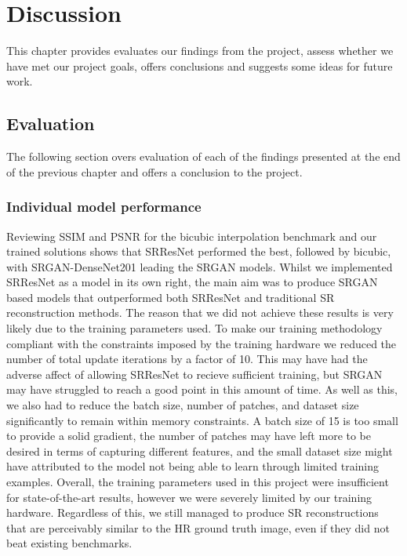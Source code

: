 \chapter{Discussion}
\label{chapter4}
This chapter provides evaluates our findings from the project, assess whether we have met our project goals, offers conclusions and suggests some ideas for future work.

\section{Evaluation}
The following section overs evaluation of each of the findings presented at the end of the previous chapter and offers a conclusion to the project.

\subsection{Individual model performance}
Reviewing SSIM and PSNR for the bicubic interpolation benchmark and our trained solutions shows that SRResNet performed the best, followed by bicubic, with SRGAN-DenseNet201 leading the SRGAN models. Whilst we implemented SRResNet as a model in its own right, the main aim was to produce SRGAN based models that outperformed both SRResNet and traditional SR reconstruction methods. The reason that we did not achieve these results is very likely due to the training parameters used. To make our training methodology compliant with the constraints imposed by the training hardware we reduced the number of total update iterations by a factor of 10. This may have had the adverse affect of allowing SRResNet to recieve sufficient training, but SRGAN may have struggled to reach a good point in this amount of time. As well as this, we also had to reduce the batch size, number of patches, and dataset size significantly to remain within memory constraints. A batch size of 15 is too small to provide a solid gradient, the number of patches may have left more to be desired in terms of capturing different features, and the small dataset size might have attributed to the model not being able to learn through limited training examples. Overall, the training parameters used in this project were insufficient for state-of-the-art results, however we were severely limited by our training hardware. Regardless of this, we still managed to produce SR reconstructions that are perceivably similar to the HR ground truth image, even if they did not beat existing benchmarks.

